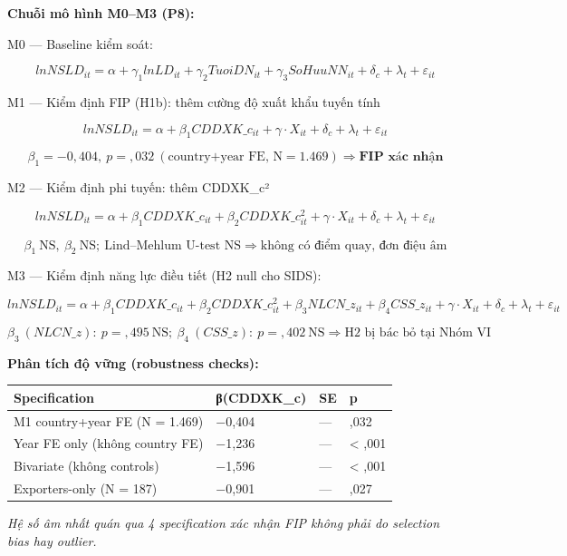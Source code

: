 \documentclass[12pt,a4paper]{article}
\begin{document}
\textbf{Chuỗi mô hình M0--M3 (P8):}

M0 --- Baseline kiểm soát:

\[lnNSLD_{it} = \alpha + \gamma_1 lnLD_{it} + \gamma_2 TuoiDN_{it} + \gamma_3 SoHuuNN_{it} + \delta_c + \lambda_t + \varepsilon_{it}\]

M1 --- Kiểm định FIP (H1b): thêm cường độ xuất khẩu tuyến tính

\[lnNSLD_{it} = \alpha + \beta_1 CDDXK\_c_{it} + \gamma \cdot X_{it} + \delta_c + \lambda_t + \varepsilon_{it}\]

\[\beta_1 = -0{,}404,\ p = {,}032\ (\text{country+year FE, N} = 1{.}469) \Rightarrow \textbf{FIP xác nhận}\]

M2 --- Kiểm định phi tuyến: thêm CDDXK\_c²

\[lnNSLD_{it} = \alpha + \beta_1 CDDXK\_c_{it} + \beta_2 CDDXK\_c^2_{it} + \gamma \cdot X_{it} + \delta_c + \lambda_t + \varepsilon_{it}\]

\[\beta_1\ \text{NS},\ \beta_2\ \text{NS};\ \text{Lind–Mehlum U-test NS} \Rightarrow \text{không có điểm quay, đơn điệu âm}\]

M3 --- Kiểm định năng lực điều tiết (H2 null cho SIDS):

\[lnNSLD_{it} = \alpha + \beta_1 CDDXK\_c_{it} + \beta_2 CDDXK\_c^2_{it} + \beta_3 NLCN\_z_{it} + \beta_4 CSS\_z_{it} + \gamma \cdot X_{it} + \delta_c + \lambda_t + \varepsilon_{it}\]

\[\beta_3\ (NLCN\_z):\ p = {,}495\ \text{NS};\ \beta_4\ (CSS\_z):\ p = {,}402\ \text{NS} \Rightarrow \text{H2 bị bác bỏ tại Nhóm VI}\]

\textbf{Phân tích độ vững (robustness checks):}

\begin{longtable}[]{@{}llll@{}}
\toprule\noalign{}
Specification & β(CDDXK\_c) & SE & p \\
\midrule\noalign{}
\endhead
\bottomrule\noalign{}
\endlastfoot
M1 country+year FE (N = 1.469) & −0,404 & --- & ,032 \\
Year FE only (không country FE) & −1,236 & --- & \textless{} ,001 \\
Bivariate (không controls) & −1,596 & --- & \textless{} ,001 \\
Exporters-only (N = 187) & −0,901 & --- & ,027 \\
\end{longtable}

\emph{Hệ số âm nhất quán qua 4 specification xác nhận FIP không phải do
selection bias hay outlier.}
\end{document}
